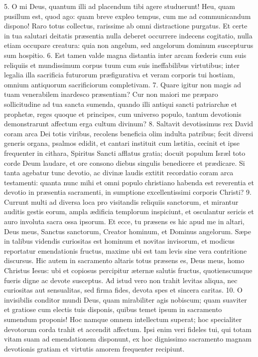 5. O mi Deus, quantum illi ad placendum tibi agere studuerunt! Heu, quam pusillum est, quod ago: quam breve expleo tempus, cum me ad communicandum dispono! Raro totus collectus, rarissime ab omni distractione purgatus. Et certe in tua salutari deitatis præsentia nulla deberet occurrere indecens cogitatio, nulla etiam occupare creatura: quia non angelum, sed angelorum dominum suscepturus sum hospitio.
6. Est tamen valde magna distantia inter arcam fœderis cum suis reliquiis et mundissimum corpus tuum cum suis ineffabilibus virtutibus; inter legalia illa sacrificia futurorum præfigurativa et veram corporis tui hostiam, omnium antiquorum sacrificiorum completivam.
7. Quare igitur non magis ad tuam venerabilem inardesco præsentiam? Cur non maiori me præparo sollicitudine ad tua sancta sumenda, quando illi antiqui sancti patriarchæ et prophetæ, reges quoque et principes, cum universo populo, tantum devotionis demonstrarunt affectum erga cultum divinum?
8. Saltavit devotissimus rex David coram arca Dei totis viribus, recolens beneficia olim indulta patribus; fecit diversi generis organa, psalmos edidit, et cantari instituit cum lætitia, cecinit et ipse frequenter in cithara, Spiritus Sancti afflatus gratia; docuit populum Isræl toto corde Deum laudare, et ore consono diebus singulis benedicere et prædicare. Si tanta agebatur tunc devotio, ac divinæ laudis extitit recordatio coram arca testamenti: quanta nunc mihi et omni populo christiano habenda est reverentia et devotio in præsentia sacramenti, in sumptione excellentissimi corporis Christi?
9. Currunt multi ad diversa loca pro visitandis reliquiis sanctorum, et mirantur auditis gestis eorum, ampla ædificia templorum inspiciunt, et osculantur sericis et auro involuta sacra ossa ipsorum. Et ecce, tu præsens es hic apud me in altari, Deus meus, Sanctus sanctorum, Creator hominum, et Dominus angelorum. Sæpe in talibus videndis curiositas est hominum et novitas invisorum, et modicus reportatur emendationis fructus, maxime ubi est tam levis sine vera contritione discursus. Hic autem in sacramento altaris totus præsens es, Deus meus, homo Christus Iesus: ubi et copiosus percipitur æternæ salutis fructus, quotienscumque fueris digne ac devote susceptus. Ad istud vero non trahit levitas aliqua, nec curiositas aut sensualitas, sed firma fides, devota spes et sincera caritas.
10. O invisibilis conditor mundi Deus, quam mirabiliter agis nobiscum; quam suaviter et gratiose cum electis tuis disponis, quibus temet ipsum in sacramento sumendum proponis! Hoc namque omnem intellectum superat; hoc specialiter devotorum corda trahit et accendit affectum. Ipsi enim veri fideles tui, qui totam vitam suam ad emendationem disponunt, ex hoc dignissimo sacramento magnam devotionis gratiam et virtutis amorem frequenter recipiunt.
